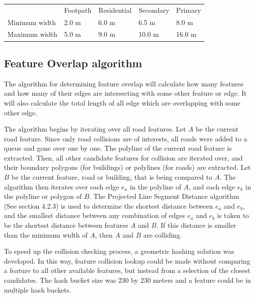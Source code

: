 \documentclass{kththesis}
\begin{document}
\begin{table}[H]
    \begin{tabular}{lllll}
                      & Footpath & Residential & Secondary & Primary \\
        Minimum width & 2.0 m    & 6.0 m       & 6.5 m     & 8.0 m   \\
        Maximum width & 5.0 m    & 9.0 m       & 10.0 m    & 16.0 m
    \end{tabular}
    \label{table:road-widths}
\end{table}

\subsection{Feature Overlap algorithm}

The algorithm for determining feature overlap will calculate how many features and how many of their edges are intersecting with some other feature or edge.
It will also calculate the total length of all edge which are overlapping with some other edge.

The algorithm begins by iterating over all road features.
Let $A$ be the current road feature.
Since only road collisions are of interests, all roads were added to a queue and gone over one by one.
The polyline of the current road feature is extracted.
Then, all other candidate features for collision are iterated over, and their boundary polygons (for buildings) or polylines (for roads) are extracted.
Let $B$ be the current feature, road or building, that is being compared to $A$.
The algorithm then iterates over each edge $e_a$ in the polyline of $A$, and each edge $e_b$ in the polyline or polygon of $B$.
The Projected Line Segment Distance algorithm (See section 4.2.3) is used to determine the shortest distance between $e_a$ and $e_b$, and the smallest distance between any combination of edges $e_a$ and $e_b$ is taken to be the shortest distance between features $A$ and $B$.
If this distance is smaller than the minimum width of $A$, then $A$ and $B$ are colliding.

To speed up the collision checking process, a geometric hashing solution was developed.
In this way, feature collision lookup could be made without comparing a feature to all other available features, but instead from a selection of the closest candidates.
The hash bucket size was 230 by 230 meters and a feature could be in multiple hash buckets.
\end{document}
